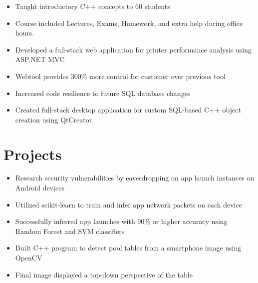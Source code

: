 \documentclass{Custom_CV}
\begin{document}
\begin{itemize}[noitemsep]
    \item Taught introductory C++ concepts to 60 students
    \item Course included Lectures, Exams, Homework, and extra help during office hours.
\end{itemize}
\begin{itemize}[rightmargin=\dimexpr\linewidth-15cm-\leftmargin\relax,noitemsep]
    \item Developed a full-stack web application for printer performance analysis using ASP.NET MVC
    \item Webtool provides 300\% more control for customer over previous tool
    \item Increased code resilience to future SQL database changes
\end{itemize}
\begin{itemize}[rightmargin=\dimexpr\linewidth-15cm-\leftmargin\relax,noitemsep]
\item Created full-stack desktop application for custom SQL-based C++ object creation using QtCreator
\end{itemize}

\section{Projects}
\begin{itemize}[rightmargin=\dimexpr\linewidth-15cm-\leftmargin\relax,noitemsep]
\item Research security vulnerabilities by eavesdropping on app launch instances on Android devices
\item Utilized scikit-learn to train and infer app network packets on each device
\item Successfully inferred app launches with 90\% or higher accuracy using Random Forest and SVM classifiers
\end{itemize}

\begin{itemize}[rightmargin=\dimexpr\linewidth-15cm-\leftmargin\relax,noitemsep]
    \item Built C++ program to detect pool tables from a smartphone image using OpenCV
    \item Final image displayed a top-down perspective of the table
\end{itemize}
\end{document}
